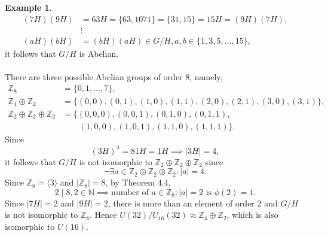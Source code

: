 \documentclass{article}
\theoremstyle{definition}
\newtheorem{example}{Example}[section]
\begin{document}
\begin{example}
\begin{align*}
            (7H)(9H) &= 63H = \{63,1071\} = \{31,15\} = 15H = (9H)(7H), \\
            & \vdots \\
            (aH)(bH) &= (bH)(aH) \in G/H, a,b \in \{1,3,5,\dots,15\},
        \end{align*}
        it follows that $G/H$ is Abelian. 
        \\ \\
        There are three possible Abelian groups of order 8, namely,
        \begin{align*}
            \mathbb{Z}_8 &= \{0,1,\dots,7\}, \\
            \mathbb{Z}_4 \oplus \mathbb{Z}_2 &= \{(0,0),(0,1),(1,0),(1,1),(2,0),(2,1),(3,0),(3,1)\}, \\
            \mathbb{Z}_2 \oplus \mathbb{Z}_2 \oplus \mathbb{Z}_2 &= \{(0,0,0),(0,0,1),(0,1,0),(0,1,1), \\
            & \quad \quad (1,0,0),(1,0,1),(1,1,0),(1,1,1)\}.
        \end{align*}
        Since 
        \begin{equation*}
            (3H)^4 = 81H = 1H \implies |3H| = 4,
        \end{equation*}
        it follows that $G/H$ is not isomorphic to $\mathbb{Z}_2 \oplus \mathbb{Z}_2 \oplus \mathbb{Z}_2$ since 
        \begin{equation*}
            \neg \exists a \in \mathbb{Z}_2 \oplus \mathbb{Z}_2 \oplus \mathbb{Z}_2: |a| = 4.
        \end{equation*}
        Since $\mathbb{Z}_8=\langle 3 \rangle$ and $|\mathbb{Z}_8|=8$, by Theorem 4.4, 
        \begin{equation*}
             2 \mid 8, 2 \in \mathbb{N} \implies \text{number of } a \in \mathbb{Z}_8: |a|=2 \text{ is } \phi(2) = 1.
        \end{equation*}
        Since $|7H|=2$ and $|9H|=2$, there is more than an element of order 2 and $G/H$ is not isomorphic to $\mathbb{Z}_8$. Hence $U(32)/U_{16}(32) \approx \mathbb{Z}_4 \oplus \mathbb{Z}_2$, which is also isomorphic to $U(16)$.
     \end{example}
     
\end{document}
